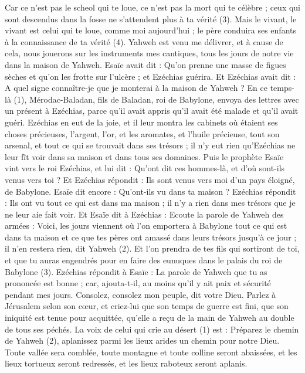 \begin{multicols}{2}
{Car ce n’est pas le scheol qui te loue, ce n’est pas la mort qui te célèbre ; ceux qui sont descendus dans la fosse ne s'attendent plus à ta vérité (3).
Mais le vivant, le vivant est celui qui te loue, comme moi aujourd'hui ; le père conduira ses enfants à la connaissance de ta vérité (4).
Yahweh est venu me délivrer, et à cause de cela, nous jouerons sur les instruments mes cantiques, tous les jours de notre vie dans la maison de Yahweh.
Esaïe avait dit : Qu'on prenne une masse de figues sèches et qu'on les frotte sur l'ulcère ; et Ezéchias guérira.
Et Ezéchias avait dit : A quel signe connaître-je que je monterai à la maison de Yahweh ?
\VerseOne{}En ce temps-là (1), Mérodac-Baladan, fils de Baladan, roi de Babylone, envoya des lettres avec un présent à Ezéchias, parce qu'il avait appris qu'il avait été malade et qu'il avait guéri.
Ezéchias en eut de la joie, et il leur montra les cabinets où étaient ses choses précieuses, l'argent, l'or, et les aromates, et l’huile précieuse, tout son arsenal, et tout ce qui se trouvait dans ses trésors ; il n'y eut rien qu'Ezéchias ne leur fît voir dans sa maison et dans tous ses domaines.
Puis le prophète Esaïe vint vers le roi Ezéchias, et lui dit : Qu'ont dit ces hommes-là, et d'où sont-ils venus vers toi ? Et Ezéchias répondit : Ils sont venus vers moi d'un pays éloigné, de Babylone.
Esaïe dit encore : Qu'ont-ils vu dans ta maison ? Ezéchias répondit : Ils ont vu tout ce qui est dans ma maison ; il n'y a rien dans mes trésors que je ne leur aie fait voir.
Et Esaïe dit à Ezéchias : Ecoute la parole de Yahweh des armées :
Voici, les jours viennent où l’on emportera à Babylone tout ce qui est dans ta maison et ce que tes pères ont amassé dans leurs trésors jusqu'à ce jour ; il n'en restera rien, dit Yahweh (2).
Et l’on prendra de tes fils qui sortiront de toi, et que tu auras engendrés pour en faire des eunuques dans le palais du roi de Babylone (3).
Ezéchias répondit à Esaïe : La parole de Yahweh que tu as prononcée est bonne ; car, ajouta-t-il, au moins qu'il y ait paix et sécurité pendant mes jours.
\VerseOne{}Consolez, consolez mon peuple, dit votre Dieu.
Parlez à Jérusalem selon son cœur, et criez-lui que son temps de guerre est fini, que son iniquité est tenue pour acquittée, qu'elle a reçu de la main de Yahweh au double de tous ses péchés.
La voix de celui qui crie au désert (1) est : Préparez le chemin de Yahweh (2), aplanissez parmi les lieux arides un chemin pour notre Dieu.
Toute vallée sera comblée, toute montagne et toute colline seront abaissées, et les lieux tortueux seront redressés, et les lieux raboteux seront aplanis.
}
\end{multicols}
